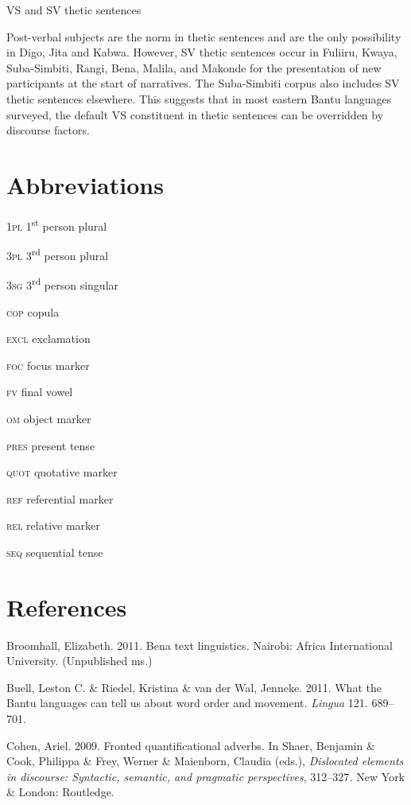 \documentclass[output=paper]{langsci/langscibook}
\begin{document}
\begin{styleLangSciTranslation}
\begin{styleLangSciTranslation}
\begin{styleLangSciTranslation}
\begin{listLFOxviileveli}
\item VS and SV thetic sentences
\end{listLFOxviileveli}

Post-verbal subjects are the norm in thetic sentences and are the only possibility in Digo, Jita and Kabwa. However, SV thetic sentences occur in Fuliiru, Kwaya, Suba-Simbiti, Rangi, Bena, Malila, and Makonde for the presentation of new participants at the start of narratives. The Suba-Simbiti corpus also includes SV thetic sentences elsewhere. This suggests that in most eastern Bantu languages surveyed, the default VS constituent in thetic sentences can be overridden by discourse factors.

\chapter{Abbreviations}

\textsc{1pl}  1\textsuperscript{st} person plural

\textsc{3pl}  3\textsuperscript{rd} person plural

\textsc{3sg}  3\textsuperscript{rd} person singular

\textsc{cop}  copula

\textsc{excl}  exclamation

\textsc{foc}  focus marker

\textsc{fv}  final vowel

\textsc{om}  object marker

\textsc{pres}  present tense

\textsc{quot}  quotative marker

\textsc{ref}   referential marker

\textsc{rel}  relative marker

\textsc{seq}  sequential tense

\chapter{References}

Broomhall, Elizabeth. 2011. Bena text linguistics\textit{.} Nairobi: Africa International University. (Unpublished ms.)

Buell, Leston C. \& Riedel, Kristina \& van der Wal, Jenneke. 2011. What the Bantu languages can tell us about word order and movement. \textit{Lingua} 121. 689–701.

Cohen, Ariel. 2009. Fronted quantificational adverbs. In Shaer, Benjamin \& Cook, Philippa \& Frey, Werner \& Maienborn, Claudia (eds.), \textit{Dislocated elements in discourse: Syntactic, semantic, and pragmatic perspectives}, 312–327\textit{.} New York \& London: Routledge.


\end{styleLangSciTranslation}
\end{styleLangSciTranslation}
\end{styleLangSciTranslation}
\end{document}
